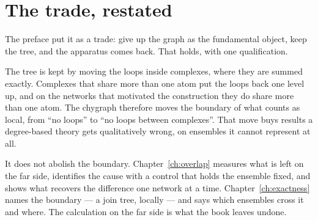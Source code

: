 \section{The trade, restated}
\label{sec:trade}

The preface put it as a trade: give up the graph as the fundamental object, keep
the tree, and the apparatus comes back. That holds, with one qualification.

The tree is kept by moving the loops inside complexes, where they are summed
exactly. Complexes that share more than one atom put the loops back one level
up, and on the networks that motivated the construction they do share more than
one atom. The chygraph therefore moves the boundary of what counts as local,
from ``no loops'' to ``no loops between complexes''. That move buys results a
degree-based theory gets qualitatively wrong, on ensembles it cannot represent
at all.

It does not abolish the boundary. Chapter~\ref{ch:overlap} measures what is left
on the far side, identifies the cause with a control that holds the ensemble
fixed, and shows what recovers the difference one network at a time.
Chapter~\ref{ch:exactness} names the boundary --- a join tree, locally ---
and says which ensembles cross it and where. The calculation on the far side
is what the book leaves undone.
